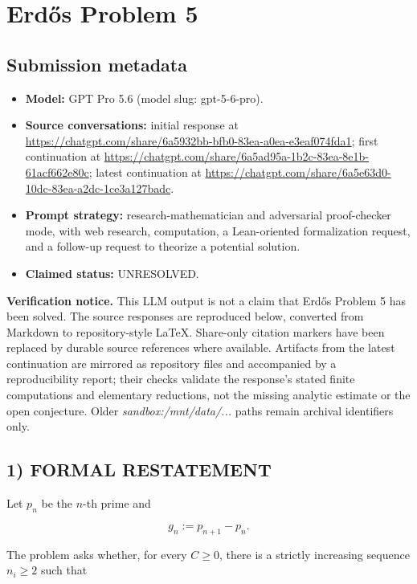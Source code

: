 \section*{Erd\H{o}s Problem 5}

\subsection*{Submission metadata}

\begin{itemize}
\item \textbf{Model:} GPT Pro 5.6 (model slug: gpt-5-6-pro).
\item \textbf{Source conversations:} initial response at \url{https://chatgpt.com/share/6a5932bb-bfb0-83ea-a0ea-e3eaf074fda1}; first continuation at \url{https://chatgpt.com/share/6a5ad95a-1b2c-83ea-8e1b-61acf662e80c}; latest continuation at \url{https://chatgpt.com/share/6a5e63d0-10dc-83ea-a2dc-1ce3a127badc}.
\item \textbf{Prompt strategy:} research-mathematician and adversarial proof-checker mode, with web research, computation, a Lean-oriented formalization request, and a follow-up request to theorize a potential solution.
\item \textbf{Claimed status:} UNRESOLVED.
\end{itemize}

\noindent\textbf{Verification notice.}
This LLM output is not a claim that Erd\H{o}s Problem 5 has been solved. The source responses are reproduced below, converted from Markdown to repository-style LaTeX. Share-only citation markers have been replaced by durable source references where available. Artifacts from the latest continuation are mirrored as repository files and accompanied by a reproducibility report; their checks validate the response's stated finite computations and elementary reductions, not the missing analytic estimate or the open conjecture. Older \emph{sandbox:/mnt/data/...} paths remain archival identifiers only.

\medskip
\medskip

\subsection*{1) FORMAL RESTATEMENT}

Let \(p_n\) be the \(n\)-th prime and

\[
g_n:=p_{n+1}-p_n.
\]

The problem asks whether, for every \(C\ge 0\), there is a strictly increasing sequence \(n_i\ge2\) such that

